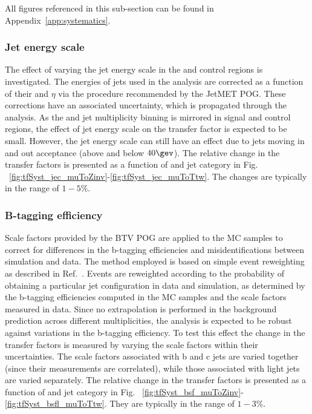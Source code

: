 All figures referenced in this sub-section can be found in Appendix~\ref{app:systematics}.

\subsubsection*{Jet energy scale}
\label{sec:tfSyst_jec}
The effect of varying the jet energy scale in
the \mj and \mmj control regions is investigated.  The energies of
jets used in the analysis are corrected as a function of their \pt and
$\eta$ via the procedure recommended by the JetMET POG. These
corrections have an associated uncertainty, which is propagated through the analysis. 
As the \scalht and jet multiplicity binning is mirrored in signal and control regions, 
the effect of jet energy scale on the transfer factor is expected to be small. 
However, the jet energy scale can still have an
effect due to jets moving in and out acceptance (above and below
$40\gev$). The relative change in the transfer factors is presented as a function of \scalht and jet category 
in Fig. ~\ref{fig:tfSyst_jec_muToZinv}-\ref{fig:tfSyst_jec_muToTtw}.
The changes are typically in the range of $1-5\%$.

\subsubsection*{B-tagging efficiency}
\label{sec:tfSyst_btag}

Scale factors provided by the BTV POG are applied to the MC samples
to correct for differences in the b-tagging efficiencies and 
misidentifications between simulation and data. 
The method employed is based on simple event reweighting as described in
Ref.~\cite{btagSFMethods}. 
Events are reweighted according to the probability of obtaining a particular jet configuration in data
and simulation, as determined by the b-tagging efficiencies computed
in the MC samples and the scale factors measured in data.
Since no extrapolation is performed in the background prediction across different 
\nb multiplicities, the analysis is expected to be robust against variations in the 
b-tagging efficiency. 
To test this effect the change in the transfer factors is measured
by varying the scale factors within their uncertainties. The scale factors
associated with b and c jets are varied together (since their measurements are
correlated), while those associated with light jets are varied separately.
The relative change in the transfer factors is presented as a function of \scalht and jet category 
in Fig. ~\ref{fig:tfSyst_bsf_muToZinv}-\ref{fig:tfSyst_bsfl_muToTtw}.
They are typically in the range of $1-3\%$.

